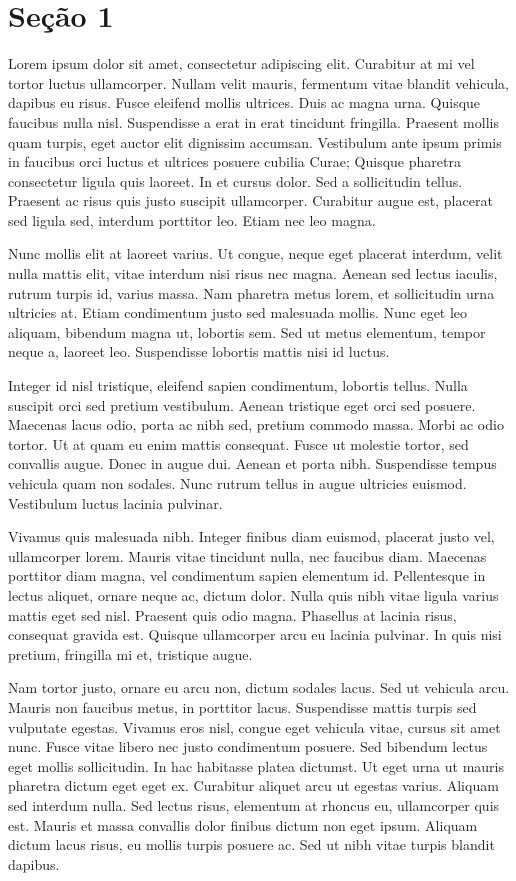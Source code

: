 \section{Seção 1}

Lorem ipsum dolor sit amet, consectetur adipiscing elit. Curabitur at mi vel tortor luctus ullamcorper. Nullam velit mauris, fermentum vitae blandit vehicula, dapibus eu risus. Fusce eleifend mollis ultrices. Duis ac magna urna. Quisque faucibus nulla nisl. Suspendisse a erat in erat tincidunt fringilla. Praesent mollis quam turpis, eget auctor elit dignissim accumsan. Vestibulum ante ipsum primis in faucibus orci luctus et ultrices posuere cubilia Curae; Quisque pharetra consectetur ligula quis laoreet. In et cursus dolor. Sed a sollicitudin tellus. Praesent ac risus quis justo suscipit ullamcorper. Curabitur augue est, placerat sed ligula sed, interdum porttitor leo. Etiam nec leo magna.

Nunc mollis elit at laoreet varius. Ut congue, neque eget placerat interdum, velit nulla mattis elit, vitae interdum nisi risus nec magna. Aenean sed lectus iaculis, rutrum turpis id, varius massa. Nam pharetra metus lorem, et sollicitudin urna ultricies at. Etiam condimentum justo sed malesuada mollis. Nunc eget leo aliquam, bibendum magna ut, lobortis sem. Sed ut metus elementum, tempor neque a, laoreet leo. Suspendisse lobortis mattis nisi id luctus.

Integer id nisl tristique, eleifend sapien condimentum, lobortis tellus. Nulla suscipit orci sed pretium vestibulum. Aenean tristique eget orci sed posuere. Maecenas lacus odio, porta ac nibh sed, pretium commodo massa. Morbi ac odio tortor. Ut at quam eu enim mattis consequat. Fusce ut molestie tortor, sed convallis augue. Donec in augue dui. Aenean et porta nibh. Suspendisse tempus vehicula quam non sodales. Nunc rutrum tellus in augue ultricies euismod. Vestibulum luctus lacinia pulvinar.

Vivamus quis malesuada nibh. Integer finibus diam euismod, placerat justo vel, ullamcorper lorem. Mauris vitae tincidunt nulla, nec faucibus diam. Maecenas porttitor diam magna, vel condimentum sapien elementum id. Pellentesque in lectus aliquet, ornare neque ac, dictum dolor. Nulla quis nibh vitae ligula varius mattis eget sed nisl. Praesent quis odio magna. Phasellus at lacinia risus, consequat gravida est. Quisque ullamcorper arcu eu lacinia pulvinar. In quis nisi pretium, fringilla mi et, tristique augue.

Nam tortor justo, ornare eu arcu non, dictum sodales lacus. Sed ut vehicula arcu. Mauris non faucibus metus, in porttitor lacus. Suspendisse mattis turpis sed vulputate egestas. Vivamus eros nisl, congue eget vehicula vitae, cursus sit amet nunc. Fusce vitae libero nec justo condimentum posuere. Sed bibendum lectus eget mollis sollicitudin. In hac habitasse platea dictumst. Ut eget urna ut mauris pharetra dictum eget eget ex. Curabitur aliquet arcu ut egestas varius. Aliquam sed interdum nulla. Sed lectus risus, elementum at rhoncus eu, ullamcorper quis est. Mauris et massa convallis dolor finibus dictum non eget ipsum. Aliquam dictum lacus risus, eu mollis turpis posuere ac. Sed ut nibh vitae turpis blandit dapibus.